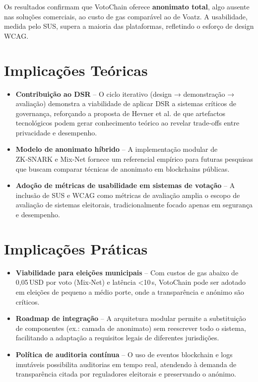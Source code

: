 Os resultados confirmam que VotoChain oferece \textbf{anonimato total}, algo ausente nas soluções comerciais, ao custo de gas comparável ao de Voatz. A usabilidade, medida pelo SUS, supera a maioria das plataformas, refletindo o esforço de design WCAG.

\section{Implicações Teóricas}
\begin{itemize}
    \item \textbf{Contribuição ao DSR} – O ciclo iterativo (design → demonstração → avaliação) demonstra a viabilidade de aplicar DSR a sistemas críticos de governança, reforçando a proposta de Hevner et al. de que artefactos tecnológicos podem gerar conhecimento teórico ao revelar trade‑offs entre privacidade e desempenho.
    \item \textbf{Modelo de anonimato híbrido} – A implementação modular de ZK‑SNARK e Mix‑Net fornece um referencial empírico para futuras pesquisas que buscam comparar técnicas de anonimato em blockchains públicas.
    \item \textbf{Adoção de métricas de usabilidade em sistemas de votação} – A inclusão de SUS e WCAG como métricas de avaliação amplia o escopo de avaliação de sistemas eleitorais, tradicionalmente focado apenas em segurança e desempenho.
\end{itemize}

\section{Implicações Práticas}
\begin{itemize}
    \item \textbf{Viabilidade para elei{\c{c}}{\~o}es municipais} – Com custos de gas abaixo de 0,05 USD por voto (Mix‑Net) e lat{\^e}ncia <10 s, VotoChain pode ser adotado em elei{\c{c}}{\~o}es de pequeno a m{\'e}dio porte, onde a transpar{\^e}ncia e an{\'o}nimo s{\~a}o cr{\'i}ticos.
    \item \textbf{Roadmap de integração} – A arquitetura modular permite a substituição de componentes (ex.: camada de anonimato) sem reescrever todo o sistema, facilitando a adaptação a requisitos legais de diferentes jurisdições.
    \item \textbf{Pol{\'i}tica de auditoria cont{\'i}nua} – O uso de eventos blockchain e logs imut{\'a}veis possibilita auditorias em tempo real, atendendo {\`a} demanda de transpar{\^e}ncia citada por reguladores eleitorais e preservando o an{\'o}nimo.
\end{itemize}

